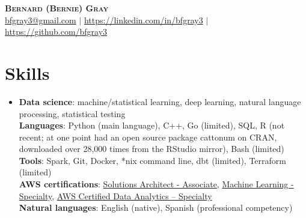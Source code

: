 \documentclass[letterpaper,11pt]{article}
\begin{document}
\begin{center}
    \textbf{\Huge \scshape Bernard (Bernie) Gray} \\ \vspace{1pt}
    \href{mailto:bfgray3@gmail.com}{bfgray3@gmail.com} $|$
    \url{https://linkedin.com/in/bfgray3} $|$
    \url{https://github.com/bfgray3}
\end{center}

\section{Skills}
\begin{itemize}[leftmargin=0.15in, label={}]
    \item{
     \textbf{Data science}{: machine/statistical learning, deep learning, natural language processing, statistical testing} \\
     \textbf{Languages}{: Python (main language), C++, Go (limited), SQL, R (not recent; at one point had an open source package cattonum on CRAN, downloaded over 28,000 times from the RStudio mirror), Bash (limited)} \\
     \textbf{Tools}{: Spark, Git, Docker, *nix command line, dbt (limited), Terraform (limited)} \\
     \textbf{AWS certifications}{: \href{https://www.credly.com/badges/d15d58be-270e-4b5e-b9cf-301d16c45d74}{Solutions Architect - Associate}, \href{https://www.credly.com/badges/4adc2428-4a38-4f95-a473-7a1571da7b28}{Machine Learning - Specialty}, \href{https://www.credly.com/badges/23d07045-d56a-4626-99f8-f0815c7d0e6b}{AWS Certified Data Analytics – Specialty}} \\
     \textbf{Natural languages}{: English (native), Spanish (professional competency)}
}
 \end{itemize}
\end{document}

